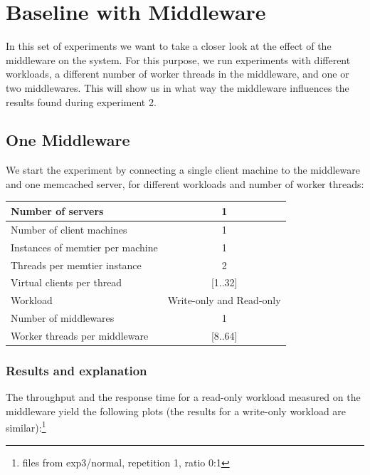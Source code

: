 \documentclass[11pt,a4paper]{article}
\begin{document}
\section{Baseline with Middleware}

In this set of experiments we want to take a closer look at the effect of the middleware on the system. For this purpose, we run experiments with different workloads, a different number of worker threads in the middleware, and one or two middlewares. This will show us in what way the middleware influences the results found during experiment 2. 


\subsection{One Middleware}

We start the experiment by connecting a single client machine to the middleware and one memcached server, for different workloads and number of worker threads: 

\begin{center}
	\scriptsize{
		\begin{tabular}{|l|c|}
			\hline Number of servers                & 1                        \\ 
			\hline Number of client machines        & 1                        \\ 
			\hline Instances of memtier per machine & 1                        \\ 
			\hline Threads per memtier instance     & 2                        \\
			\hline Virtual clients per thread       & [1..32]                  \\ 
			\hline Workload                         & Write-only and Read-only \\
			\hline Number of middlewares            & 1                        \\
			\hline Worker threads per middleware    & [8..64]                  \\
			\hline 
		\end{tabular}
	} 
\end{center}

\subsubsection{Results and explanation}

The throughput and the response time for a read-only workload measured on the middleware yield the following plots (the results for a write-only workload are similar):\footnote{files from exp3/normal, repetition 1, ratio 0:1}
\end{document}
